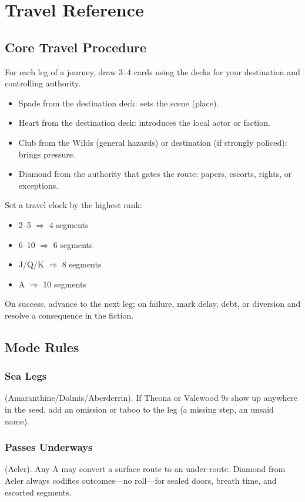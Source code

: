 \chapter{Travel Reference}

\section{Core Travel Procedure}

For each leg of a journey, draw 3--4 cards using the decks for your destination and controlling authority.

\begin{itemize}
\item Spade from the destination deck: sets the scene (place).
\item Heart from the destination deck: introduces the local actor or faction.
\item Club from the Wilds (general hazards) or destination (if strongly policed): brings pressure.
\item Diamond from the authority that gates the route: papers, escorts, rights, or exceptions.
\end{itemize}

Set a travel clock by the highest rank:
\begin{itemize}
\item 2--5 $\Rightarrow$ 4 segments
\item 6--10 $\Rightarrow$ 6 segments
\item J/Q/K $\Rightarrow$ 8 segments
\item A $\Rightarrow$ 10 segments
\end{itemize}

On success, advance to the next leg; on failure, mark delay, debt, or diversion and resolve a consequence in the fiction.

\section{Mode Rules}

\subsection{Sea Legs}
(Amaranthine/Dolmis/Aberderrin). If Theona or Valewood 9s show up anywhere in the seed, add an omission or taboo to the leg (a missing step, an unsaid name).

\subsection{Passes Underways}
(Aeler). Any A may convert a surface route to an under-route. Diamond from Aeler always codifies outcomes---no roll---for sealed doors, breath time, and escorted segments.

